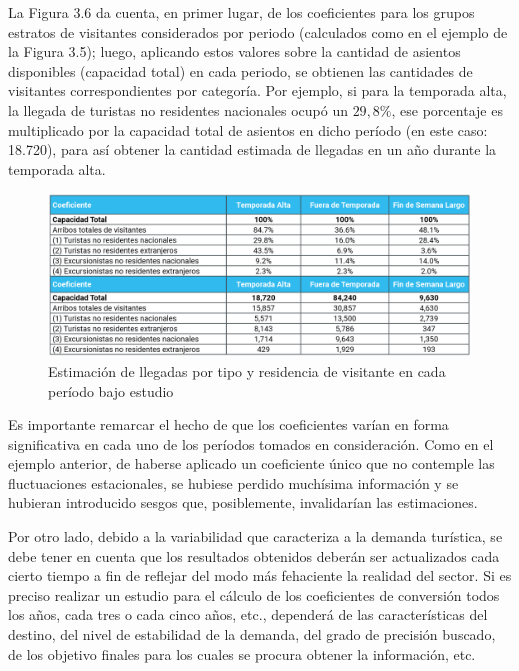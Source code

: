 \documentclass[
]{book}
\begin{document}
La Figura 3.6 da cuenta, en primer lugar, de los coeficientes para los grupos estratos de visitantes considerados por periodo (calculados como en el ejemplo de la Figura 3.5); luego, aplicando estos valores sobre la cantidad de asientos disponibles (capacidad total) en cada periodo, se obtienen las cantidades de visitantes correspondientes por categoría. Por ejemplo, si para la temporada alta, la llegada de turistas no residentes nacionales ocupó un \(29,8\%\), ese porcentaje es multiplicado por la capacidad total de asientos en dicho período (en este caso: 18.720), para así obtener la cantidad estimada de llegadas en un año durante la temporada alta.

\begin{figure}

{\centering \includegraphics[width=0.8\linewidth]{imagenes/figura08} 

}

\caption{Estimación de llegadas por tipo y residencia de visitante en cada período bajo estudio}\label{fig:llegadasportipo}
\end{figure}

Es importante remarcar el hecho de que los coeficientes varían en forma significativa en cada uno de los períodos tomados en consideración. Como en el ejemplo anterior, de haberse aplicado un coeficiente único que no contemple las fluctuaciones estacionales, se hubiese perdido muchísima información y se hubieran introducido sesgos que, posiblemente, invalidarían las estimaciones.

Por otro lado, debido a la variabilidad que caracteriza a la demanda turística, se debe tener en cuenta que los resultados obtenidos deberán ser actualizados cada cierto tiempo a fin de reflejar del modo más fehaciente la realidad del sector. Si es preciso realizar un estudio para el cálculo de los coeficientes de conversión todos los años, cada tres o cada cinco años, etc., dependerá de las características del destino, del nivel de estabilidad de la demanda, del grado de precisión buscado, de los objetivo finales para los cuales se procura obtener la información, etc.
\end{document}
